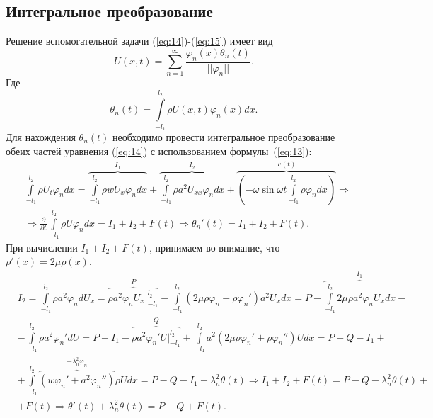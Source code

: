 \documentclass[12pt, a4paper]{article}
\begin{document}
\subsection{Интегральное преобразование}
Решение вспомогательной задачи (\ref{eq:14})-(\ref{eq:15}) имеет вид 
\begin{equation}
  U(x,t)=\sum \limits_{n=1}^{\infty} \frac{\varphi_n(x) \theta_n(t)}{||\varphi_n||}.
\end{equation}
Где
\begin{equation}
  \theta_n(t) = \int \limits_{-l_1}^{l_2} \rho U(x,t) \varphi_n(x) dx.
  \label{eq:13}
\end{equation}
Для нахождения $\theta_n(t)$ необходимо провести интегральное преобразование обеих частей уравнения (\ref{eq:14}) с использованием формулы~(\ref{eq:13}):
\begin{equation}
  \begin{aligned}
    & \int \limits_{-l_1}^{l_2} \rho U_t \varphi_n dx = \overbrace{\int \limits_{-l_1}^{l_2} \rho w U_x \varphi_n dx}^{I_1} + \overbrace{\int \limits_{-l_1}^{l_2} \rho a^2 U_{xx} \varphi_n dx}^{I_2} +  \overbrace{\left( -\omega \sin \omega t \int \limits_{-l_1}^{l_2} \rho \varphi_n dx \right)}^{F(t)}  \Rightarrow \\
  & \Rightarrow \frac{\partial}{\partial t} \int \limits_{-l_1}^{l_2} \rho U \varphi_n dx = I_1 + I_2 + F(t) \Rightarrow \theta_n'(t) = I_1 + I_2 + F(t).
\end{aligned}
\end{equation}
При вычислении $I_1+I_2+F(t)$, принимаем во внимание, что $\rho'(x) = 2 \mu \rho(x)$.
\begin{equation}
  \begin{aligned}
    & I_2 = \int \limits_{-l_1}^{l_2} \rho a^2 \varphi_n d U_x = \overbrace{\rho a^2 \varphi_n U_x \Big|^{l_2}_{-l_1}}^P - 
    \int \limits_{-l_1}^{l_2} (2\mu\rho\varphi_n + \rho\varphi_n') a^2 U_x dx = P - \overbrace{\int \limits_{-l_1}^{l_2} 2 \mu \rho a^2 \varphi_n U_x dx}^{I_1} - \\
    & - \int \limits_{-l_1}^{l_2} \rho a^2\varphi_n'd U = P - I_1 - \overbrace{\rho a^2 \varphi_n' U \Big|^{l_2}_{-l_1}}^Q + 
    \int \limits_{-l_1}^{l_2} a^2 (2\mu\rho\varphi_n' + \rho\varphi_n'') U dx = P - Q - I_1 + \\
    & + \int \limits_{-l_1}^{l_2} \overbrace{(w\varphi_n' + a^2\varphi_n'')}^{-\lambda_n^2\varphi_n} \rho U dx = P - Q - I_1 - \lambda_n^2 \theta(t) \Rightarrow I_1 + I_2 + F(t) = P - Q - 
    \lambda_n^2 \theta(t) + \\
    & + F(t) \Rightarrow \theta'(t) + \lambda_n^2 \theta(t) = P - Q + F(t).
  \end{aligned}
  \label{eq:17}
\end{equation}
\end{document}
